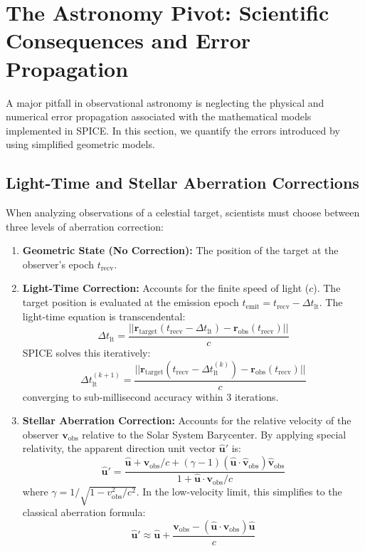\documentclass{acta}
\begin{document}
\section{The Astronomy Pivot: Scientific Consequences and Error Propagation}
A major pitfall in observational astronomy is neglecting the physical and numerical error propagation associated with the mathematical models implemented in SPICE. In this section, we quantify the errors introduced by using simplified geometric models.

\subsection{Light-Time and Stellar Aberration Corrections}
When analyzing observations of a celestial target, scientists must choose between three levels of aberration correction:
\begin{enumerate}
\item {\bf Geometric State (No Correction):} The position of the target at the observer's epoch $t_{\text{recv}}$.
\item {\bf Light-Time Correction:} Accounts for the finite speed of light ($c$). The target position is evaluated at the emission epoch $t_{\text{emit}} = t_{\text{recv}} - \Delta t_{\text{lt}}$. The light-time equation is transcendental:
\begin{equation}
\Delta t_{\text{lt}} = \frac{||\mathbf{r}_{\text{target}}(t_{\text{recv}} - \Delta t_{\text{lt}}) - \mathbf{r}_{\text{obs}}(t_{\text{recv}})||}{c}
\end{equation}
SPICE solves this iteratively:
\begin{equation}
\Delta t_{\text{lt}}^{(k+1)} = \frac{||\mathbf{r}_{\text{target}}(t_{\text{recv}} - \Delta t_{\text{lt}}^{(k)}) - \mathbf{r}_{\text{obs}}(t_{\text{recv}})||}{c}
\end{equation}
converging to sub-millisecond accuracy within $3$ iterations.
\item {\bf Stellar Aberration Correction:} Accounts for the relative velocity of the observer $\mathbf{v}_{\text{obs}}$ relative to the Solar System Barycenter. By applying special relativity, the apparent direction unit vector $\mathbf{\hat{u}}'$ is:
\begin{equation}
\mathbf{\hat{u}}' = \frac{\mathbf{\hat{u}} + \mathbf{v}_{\text{obs}}/c + (\gamma - 1)(\mathbf{\hat{u}} \cdot \mathbf{\hat{v}}_{\text{obs}}) \mathbf{\hat{v}}_{\text{obs}}}{1 + \mathbf{\hat{u}} \cdot \mathbf{v}_{\text{obs}}/c}
\end{equation}
where $\gamma = 1/\sqrt{1 - v_{\text{obs}}^2/c^2}$. In the low-velocity limit, this simplifies to the classical aberration formula:
\begin{equation}
\mathbf{\hat{u}}' \approx \mathbf{\hat{u}} + \frac{\mathbf{v}_{\text{obs}} - (\mathbf{\hat{u}} \cdot \mathbf{v}_{\text{obs}})\mathbf{\hat{u}}}{c}
\end{equation}
\end{enumerate}
\end{document}
